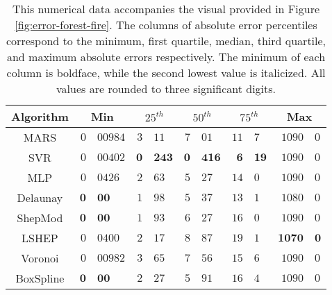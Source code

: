 \documentclass[doublespace,nopageskip]{VTthesis} %
\begin{document}
\begin{appendices}
  \begin{table}[H]
    \centering
    \begin{tabular}{c|r@{.}l|r@{.}l|r@{.}l|r@{.}l|r@{.}l}
      \hline
      Algorithm & \multicolumn{2}{c|}{Min} & \multicolumn{2}{c|}{$25^{th}$} & \multicolumn{2}{c|}{$50^{th}$} & \multicolumn{2}{c|}{$75^{th}$} & \multicolumn{2}{c}{Max}\\
      \hline
      MARS & $0$&$00984$ & $3$&$11$ & $7$&$01$ & $\mathit{11}$&$\mathit{7}$ & $1090$&$0$\\
      SVR & $\mathit{0}$&$\mathit{00402}$ & $\mathbf{0}$&$\mathbf{243}$ & $\mathbf{0}$&$\mathbf{416}$ & $\mathbf{6}$&$\mathbf{19}$ & $1090$&$0$\\
      MLP & $0$&$0426$ & $2$&$63$ & $\mathit{5}$&$\mathit{27}$ & $14$&$0$ & $1090$&$0$\\
      Delaunay & $\mathbf{0}$&$\mathbf{00}$ & $1$&$98$ & $5$&$37$ & $13$&$1$ & $\mathit{1080}$&$\mathit{0}$\\
      ShepMod & $\mathbf{0}$&$\mathbf{00}$ & $\mathit{1}$&$\mathit{93}$ & $6$&$27$ & $16$&$0$ & $1090$&$0$\\
      LSHEP & $0$&$0400$ & $2$&$17$ & $8$&$87$ & $19$&$1$ & $\mathbf{1070}$&$\mathbf{0}$\\
      Voronoi & $0$&$00982$ & $3$&$65$ & $7$&$56$ & $15$&$6$ & $1090$&$0$\\
      BoxSpline & $\mathbf{0}$&$\mathbf{00}$ & $2$&$27$ & $5$&$91$ & $16$&$4$ & $1090$&$0$\\
      \hline
    \end{tabular}
    \caption{This numerical data accompanies the visual provided in
      Figure \ref{fig:error-forest-fire}. The columns of absolute error
      percentiles correspond to the minimum, first quartile, median,
      third quartile, and maximum absolute errors respectively. The
      minimum of each column is boldface, while the second lowest value
      is italicized. All values are rounded to three significant
      digits.}
    \label{table:error-forest-fire}
  \end{table}


\end{appendices}
\end{document}
